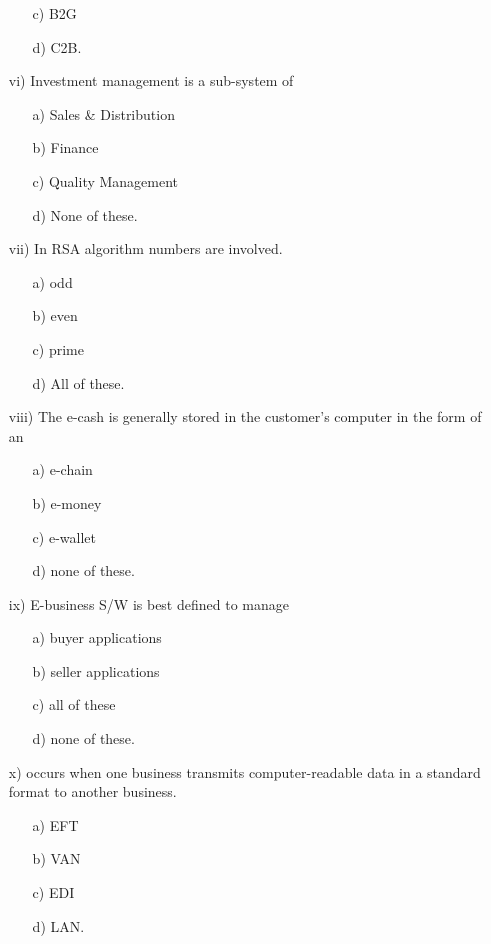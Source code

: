 \documentclass{article}
\begin{document}
\begin{enumerate}
\begin{enumerate}
        \item[c)] B2G
        \item[d)] C2B.
    \end{enumerate}
    \item[vi)] Investment management is a sub-system of
    \begin{enumerate}
        \item[a)] Sales \& Distribution
        \item[b)] Finance
        \item[c)] Quality Management
        \item[d)] None of these.
    \end{enumerate}
    \item[vii)] In RSA algorithm \underline{\hspace{2cm}} numbers are involved.
    \begin{enumerate}
        \item[a)] odd
        \item[b)] even
        \item[c)] prime
        \item[d)] All of these.
    \end{enumerate}
    \item[viii)] The e-cash is generally stored in the customer's computer in the form of an
    \begin{enumerate}
        \item[a)] e-chain
        \item[b)] e-money
        \item[c)] e-wallet
        \item[d)] none of these.
    \end{enumerate}
    \item[ix)] E-business S/W is best defined to manage
    \begin{enumerate}
        \item[a)] buyer applications
        \item[b)] seller applications
        \item[c)] all of these
        \item[d)] none of these.
    \end{enumerate}
    \item[x)] \underline{\hspace{2cm}} occurs when one business transmits computer-readable data in a standard format to another business.
    \begin{enumerate}
        \item[a)] EFT
        \item[b)] VAN
        \item[c)] EDI
        \item[d)] LAN.
    \end{enumerate}
\end{enumerate}
\end{document}
